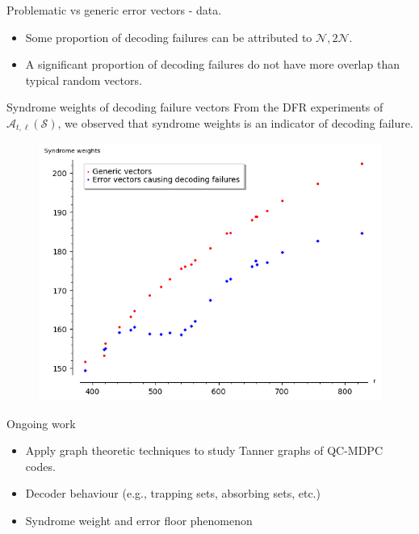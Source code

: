 \begin{frame}{Problematic vs generic error vectors - data.}
\begin{itemize}
\item Some proportion of decoding failures can be attributed to $\mathcal{N}, 2\mathcal{N}$.
\item A significant proportion of decoding failures do not have more overlap than typical random vectors.
\end{itemize}
\end{frame}

\begin{frame}{Syndrome weights of decoding failure vectors}
    From the DFR experiments of $\mathcal{A}_{t,\ell}(\mathcal{S})$, we observed that syndrome weights is an indicator of decoding failure.
    
    \begin{figure}
        \centering
        \includegraphics[scale=0.6]{Images/average_sw_generic_vs_DF_T3.png}
    \end{figure}
\end{frame}

\begin{frame}{Ongoing work}
    \begin{itemize}
        \item Apply graph theoretic techniques to study Tanner graphs of QC-MDPC codes.
\item Decoder behaviour (e.g., trapping sets, absorbing sets, etc.)
\item Syndrome weight and error floor phenomenon
    \end{itemize}
\end{frame}